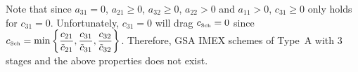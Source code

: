 Note that since $a_{31} = 0$, $a_{21} \geq 0$, $a_{32} \geq 0$, $a_{22} > 0$ and $a_{11} >0$, $c_{31} \geq 0$ only holds for $c_{31} = 0$.
Unfortunately, $c_{31} = 0$ will drag $c_{\mbox{\tiny Sch}} = 0$ since $c_{\mbox{\tiny Sch}} = \min \left\lbrace \dfrac{c_{21}}{\tilde{c}_{21}}, \dfrac{c_{31}}{\tilde{c}_{31}}, \dfrac{c_{32}}{\tilde{c}_{32}}\right\rbrace $.
Therefore, GSA IMEX schemes of Type~A with 3 stages and the above properties does not exist.
